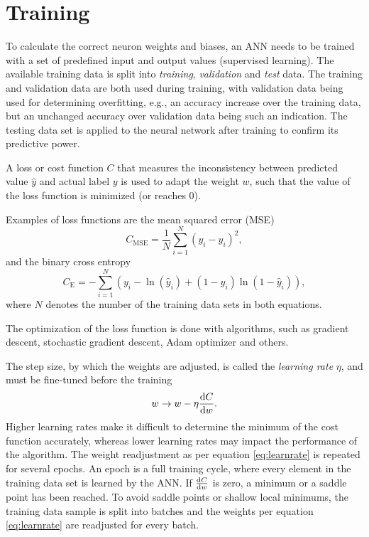 \section{Training}
To calculate the correct neuron weights and biases, an ANN needs to be trained with a set of predefined input and output values (supervised learning). The available training data is split into \emph{training}, \emph{validation} and \emph{test} data. The training and validation data are both used during training, with validation data being used for determining overfitting, e.g., an accuracy increase over the training data, but an unchanged accuracy over validation data being such an indication. The testing data set is applied to the neural network after training to confirm its predictive power.

A loss or cost function $C$ that measures the inconsistency between predicted value $\hat{y}$ and actual label $y$ is used to adapt the weight $w$, such that the value of the loss function is minimized (or reaches 0). 

Examples of loss functions are the mean squared error (MSE)
\begin{equation}\label{eq:mse}
C_{\text{MSE}}=\frac{1}{N} \sum_{i=1}^N (y_i-\hat{y}_i)^2,
\end{equation}
and the binary cross entropy
\begin{equation}\label{eq:cross_entropy}
C_{\text{E}}=-\sum_{i=1}^N \left(y_i-\ln{(\hat{y}_i)+(1-y_i)\ln{(1-\hat{y}_i)}}\right),
\end{equation}
where $N$ denotes the number of the training data sets in both equations.

The optimization of the loss function is done with algorithms, such as gradient descent, stochastic gradient descent, Adam optimizer and others.

The step size, by which the weights are adjusted, is called the \emph{learning rate} $\eta$, and must be fine-tuned before the training
\begin{equation}\label{eq:learnrate}
    w \rightarrow w - \eta \dv{C}{w}.
\end{equation}
Higher learning rates make it difficult to determine the minimum of the cost function accurately, whereas lower learning rates may impact the performance of the algorithm. The weight readjustment as per equation \ref{eq:learnrate} is repeated for several epochs. An epoch is a full training cycle, where every element in the training data set is learned by the ANN. If $\dv{C}{w}$ is zero, a minimum or a saddle point has been reached. To avoid saddle points or shallow local minimums, the training data sample is split into batches and the weights per equation \ref{eq:learnrate} are readjusted for every batch.

